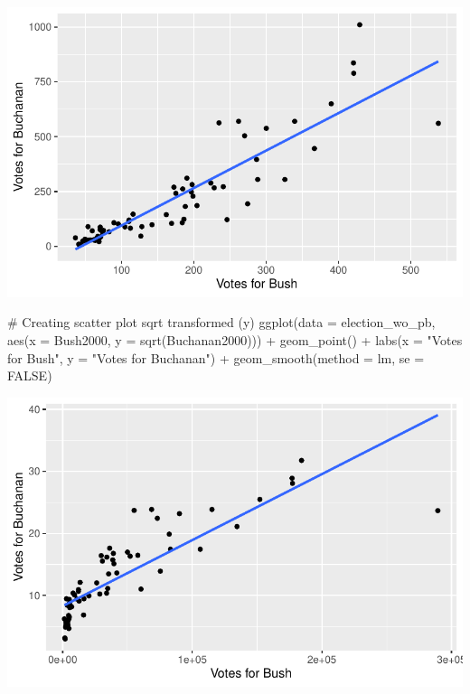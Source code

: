 \documentclass[
  letterpaper,
  DIV=11,
  numbers=noendperiod]{scrartcl}
\newenvironment{Shaded}{\begin{snugshade}}{\end{snugshade}}
\newcommand{\AttributeTok}[1]{\textcolor[rgb]{0.40,0.45,0.13}{#1}}
\newcommand{\CommentTok}[1]{\textcolor[rgb]{0.37,0.37,0.37}{#1}}
\newcommand{\ConstantTok}[1]{\textcolor[rgb]{0.56,0.35,0.01}{#1}}
\newcommand{\FunctionTok}[1]{\textcolor[rgb]{0.28,0.35,0.67}{#1}}
\newcommand{\NormalTok}[1]{\textcolor[rgb]{0.00,0.23,0.31}{#1}}
\newcommand{\SpecialCharTok}[1]{\textcolor[rgb]{0.37,0.37,0.37}{#1}}
\newcommand{\StringTok}[1]{\textcolor[rgb]{0.13,0.47,0.30}{#1}}
\begin{document}
\includegraphics{case-study-template_files/figure-pdf/unnamed-chunk-6-4.pdf}

\begin{Shaded}
\begin{Highlighting}[]
\CommentTok{\# Creating scatter plot sqrt transformed (y)}
\FunctionTok{ggplot}\NormalTok{(}\AttributeTok{data =}\NormalTok{ election\_wo\_pb, }\FunctionTok{aes}\NormalTok{(}\AttributeTok{x =}\NormalTok{ Bush2000, }\AttributeTok{y =} \FunctionTok{sqrt}\NormalTok{(Buchanan2000))) }\SpecialCharTok{+}
  \FunctionTok{geom\_point}\NormalTok{() }\SpecialCharTok{+}
  \FunctionTok{labs}\NormalTok{(}\AttributeTok{x =} \StringTok{"Votes for Bush"}\NormalTok{, }\AttributeTok{y =} \StringTok{"Votes for Buchanan"}\NormalTok{) }\SpecialCharTok{+}
  \FunctionTok{geom\_smooth}\NormalTok{(}\AttributeTok{method =}\NormalTok{ lm, }\AttributeTok{se =} \ConstantTok{FALSE}\NormalTok{)}
\end{Highlighting}
\end{Shaded}

\includegraphics{case-study-template_files/figure-pdf/unnamed-chunk-6-5.pdf}
\end{document}
